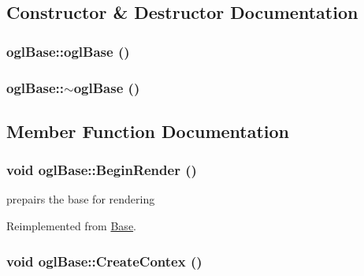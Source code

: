 \subsection{Constructor \& Destructor Documentation}
\hypertarget{classogl_base_b45c72c8aa5cb0071ac177c92acb9eaf}{
\subsubsection[{oglBase}]{\setlength{\rightskip}{0pt plus 5cm}oglBase::oglBase ()}}
\label{classogl_base_b45c72c8aa5cb0071ac177c92acb9eaf}


\hypertarget{classogl_base_878d003e71fb5100c14234067b5127cf}{
\subsubsection[{$\sim$oglBase}]{\setlength{\rightskip}{0pt plus 5cm}oglBase::$\sim$oglBase ()}}
\label{classogl_base_878d003e71fb5100c14234067b5127cf}




\subsection{Member Function Documentation}
\hypertarget{classogl_base_a75a22cce4389543fe130f5540dd481b}{
\subsubsection[{BeginRender}]{\setlength{\rightskip}{0pt plus 5cm}void oglBase::BeginRender ()}}
\label{classogl_base_a75a22cce4389543fe130f5540dd481b}


prepairs the base for rendering 

Reimplemented from \hyperlink{class_base_f724516dec5bd0ebf330ac4697a4992e}{Base}.\hypertarget{classogl_base_fcf2db7348389e95bbd9d6f27450463a}{
\subsubsection[{CreateContex}]{\setlength{\rightskip}{0pt plus 5cm}void oglBase::CreateContex ()}}
\label{classogl_base_fcf2db7348389e95bbd9d6f27450463a}


